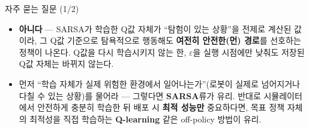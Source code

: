 \begin{frame}{자주 묻는 질문 (1/2)}
  \begin{itemize}
    \item {}
      \textbf{아니다} --- SARSA가 학습한 Q값 자체가 ``탐험이 있는
      상황''을 전제로 계산된 값이라, 그 Q값 기준으로 탐욕적으로
      행동해도 \textbf{여전히 안전한(먼) 경로}를 선호하는 정책이
      나온다. Q값을 다시 학습시키지 않는 한, $\varepsilon$을 실행
      시점에만 낮춰도 저장된 Q값 자체는 바뀌지 않는다.
    \item {}
      먼저 ``학습 자체가 실제 위험한 환경에서 일어나는가''(로봇이
      실제로 넘어지거나 다칠 수 있는 상황)를 물어라 --- 그렇다면
      \textbf{SARSA}류가 유리.
      반대로 시뮬레이터에서 안전하게 충분히 학습한 뒤 배포 시
      \textbf{최적 성능만} 중요하다면, 목표 정책 자체의 최적성을
      직접 학습하는 \textbf{Q-learning} 같은 off-policy 방법이 유리.
  \end{itemize}
\end{frame}
